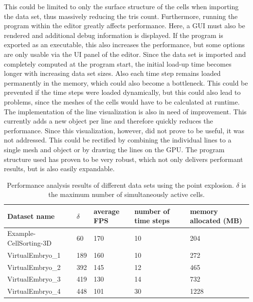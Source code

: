 This could be limited to only the surface structure of the cells when importing the data set, thus massively reducing the tris count. Furthermore, running the program within the editor greatly affects performance. Here, a GUI must also be rendered and additional debug information is displayed. If the program is exported as an executable, this also increases the performance, but some options are only usable via the UI panel of the editor. 
Since the data set is imported and completely computed at the program start, the initial load-up time becomes longer with increasing data set sizes. Also each time step remains loaded permanently in the memory, which could also become a bottleneck. This could be prevented if the time steps were loaded dynamically, but this could also lead to problems, since the meshes of the cells would have to be calculated at runtime. The implementation of the line visualization is also in need of improvement. This currently adds a new object per line and therefore quickly reduces the performance. Since this visualization, however, did not prove to be useful, it was not addressed. This could be rectified by combining the individual lines to a single mesh and object or by drawing the lines on the GPU. The program structure used has proven to be very robust, which not only delivers performant results, but is also easily expandable.


\begin{table}[h]
	\centering
	\caption{Performance analysis results of different data sets using the point explosion. $\delta$ is the maximum number of simultaneously active cells.}
	\label{tab:performance}
	\renewcommand{\arraystretch}{1.3}
	\begin{tabular}{@{}lllll@{}}
		\toprule
		Dataset name          &    $\delta$     & average FPS     & number of time steps  & memory allocated (MB)            \\ \midrule
		Example-CellSorting-3D     & 60  & 170 & 10 &  204       \\ 
		VirtualEmbryo\_1 &  189  & 160  &  10 & 272  \\ 
		VirtualEmbryo\_2 & 392  &  145  &  12 & 465   \\
		VirtualEmbryo\_3 & 419 &  130 & 14 & 732  \\
		VirtualEmbryo\_4 & 448 & 101 & 30 & 1228  \\\bottomrule
	\end{tabular}
\end{table}

